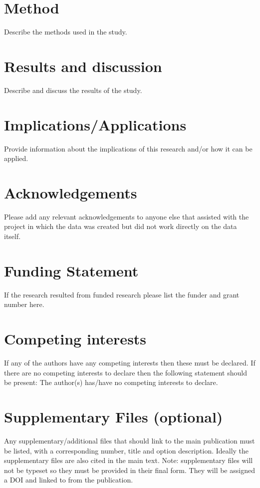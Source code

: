 \documentclass{article}
\begin{document}
\section{Method}
Describe the methods used in the study.

\section{Results and discussion}
Describe and discuss the results of the study.

\section{Implications/Applications}
Provide information about the implications of this research and/or how it can be applied.


\section*{Acknowledgements}
Please add any relevant acknowledgements to anyone else that assisted with the project in which the data was created but did not work directly on the data itself.

\section*{Funding Statement}
If the research resulted from funded research please list the funder and grant number here.

\section*{Competing interests} 
If any of the authors have any competing interests then these must be declared. If there are no competing interests to declare then the following statement should be present: The author(s) has/have no competing interests to declare.

\theendnotes




\section*{Supplementary Files (optional)}
Any supplementary/additional files that should link to the main publication must be listed, with a corresponding number, title and option description. Ideally the supplementary files are also cited in the main text.
Note: supplementary files will not be typeset so they must be provided in their final form. They will be assigned a DOI and linked to from the publication.
\end{document}
